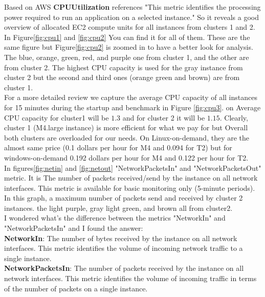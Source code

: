 \documentclass[12pt]{article}
\begin{document}
        \noindent Based on AWS \textbf{CPUUtilization} references "This metric identifies the processing power required to run an application on a selected instance." So it reveals a good overview of allocated EC2 compute units for all instances from clusters 1 and 2. In Figure\ref{fig:cpu1} and \ref{fig:cpu2} You can find it for all of them. These are the same figure but Figure\ref{fig:cpu2} is zoomed in to have a better look for analysis. \\
        The blue, orange, green, red, and purple one from cluster 1, and the other are from cluster 2. The highest CPU capacity is used for the gray instance from cluster 2 but the second and third ones (orange green and brown)  are from cluster 1.\\ For a more detailed review  we capture the average CPU capacity of all instances for 15 minutes during the startup and benchmark in Figure \ref{fig:cpu3}. on Average CPU capacity for cluster1 will be $1.3$ and for cluster 2 it will be $1.15$. Clearly, cluster 1 (M4.large instance) is more efficient for what we pay for but Overall both clusters are overloaded for our needs. On Linux-on-demand, they are the almost same price (0.1 dollars per hour for M4 and 0.094 for T2) but for windows-on-demand 0.192 dollars per  hour for M4 and 0.122 per hour for T2.\\
        In figures\ref{fig:netin} and \ref{fig:netout} "NetworkPacketsIn" and  "NetworkPacketsOut" metric. It is The number of packets received/send by the instance on all network interfaces. This metric is available for basic monitoring only (5-minute periods). In this graph, a maximum number of packets send and received by cluster 2 instances. the light purple, gray light green, and brown all from cluster2.\\
          I‌ wondered what's the difference between the metrics "NetworkIn"  and "NetworkPacketsIn" and I‌ found the answer:\\
         \textbf{NetworkIn}:‌ The number of bytes received by the instance on all network interfaces. This metric identifies the volume of incoming network traffic to a single instance.\\
        \textbf{NetworkPacketsIn}: The number of packets received by the instance on all network interfaces. This metric identifies the volume of incoming traffic in terms of the number of packets on a single instance.\\
\end{document}
